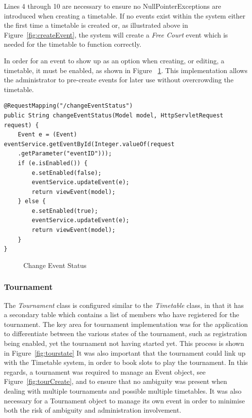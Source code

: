 Lines 4 through 10 are necessary to ensure no NullPointerExceptions are introduced when creating a timetable. If no events exist within the system either the first time a timetable is created or, as illustrated above in Figure~\ref{fig:createEvent}, the system will create a \textit{Free Court} event which is needed for the timetable to function correctly.

In order for an event to show up as an option when creating, or editing, a timetable, it must be enabled, as shown in Figure ~\ref{fig:enableEvent}. This implementation allows the administrator to pre-create events for later use without overcrowding the timetable.

\begin{lstlisting}
@RequestMapping("/changeEventStatus")
public String changeEventStatus(Model model, HttpServletRequest request) {
	Event e = (Event) eventService.getEventById(Integer.valueOf(request
	.getParameter("eventID")));
	if (e.isEnabled()) {
		e.setEnabled(false);
		eventService.updateEvent(e);
		return viewEvent(model);
	} else {
		e.setEnabled(true);
		eventService.updateEvent(e);
		return viewEvent(model);
	}
}
\end{lstlisting}
\begin{figure}[H]
\caption{Change Event Status}
\label{fig:enableEvent}
\end{figure} 	

\subsubsection{Tournament}

The \textit{Tournament} class is configured similar to the \textit{Timetable} class, in that it has a secondary table which contains a list of members who have registered for the tournament. The key area for tournament implementation was for the application to differentiate between the various states of the tournament, such as registration being enabled, yet the tournament not having started yet. This process is shown in Figure~\ref{fig:tourstate} It was also important that the tournament could link up with the Timetable system, in order to book slots to play the tournament. In this regards, a tournament was required to manage an Event object, see Figure~\ref{fig:tourCreate}, and to ensure that no ambiguity was present when dealing with multiple tournaments and possible multiple timetables. It was also necessary for a Tournament object to manage its own event in order to minimise both the risk of ambiguity and administration involvement.


